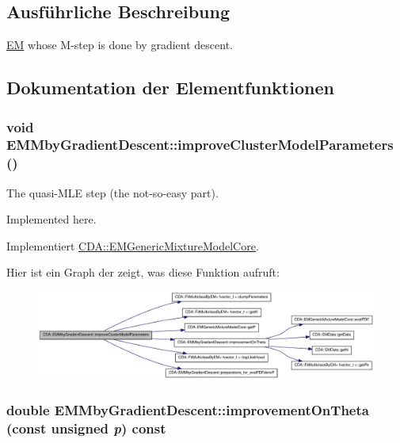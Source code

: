 \subsection{Ausführliche Beschreibung}
\hyperlink{classCDA_1_1EM}{EM} whose M-\/step is done by gradient descent. 

\subsection{Dokumentation der Elementfunktionen}
\hypertarget{classCDA_1_1EMMbyGradientDescent_ae948fd6ba3080c1f484b3fb5a262f587}{
\subsubsection[{improveClusterModelParameters}]{\setlength{\rightskip}{0pt plus 5cm}void EMMbyGradientDescent::improveClusterModelParameters ()}}
\label{classCDA_1_1EMMbyGradientDescent_ae948fd6ba3080c1f484b3fb5a262f587}


The quasi-\/MLE step (the not-\/so-\/easy part). 

Implemented here. 

Implementiert \hyperlink{classCDA_1_1EMGenericMixtureModelCore_a5a7545c679b386086bf3776315e26435}{CDA::EMGenericMixtureModelCore}.



Hier ist ein Graph der zeigt, was diese Funktion aufruft:\nopagebreak
\begin{figure}[H]
\begin{center}
\leavevmode
\includegraphics[width=420pt]{classCDA_1_1EMMbyGradientDescent_ae948fd6ba3080c1f484b3fb5a262f587_cgraph}
\end{center}
\end{figure}


\hypertarget{classCDA_1_1EMMbyGradientDescent_a9069cb24c24f1c6021d749bd4e0dd7e6}{
\subsubsection[{improvementOnTheta}]{\setlength{\rightskip}{0pt plus 5cm}double EMMbyGradientDescent::improvementOnTheta (const unsigned {\em p}) const}}
\label{classCDA_1_1EMMbyGradientDescent_a9069cb24c24f1c6021d749bd4e0dd7e6}


